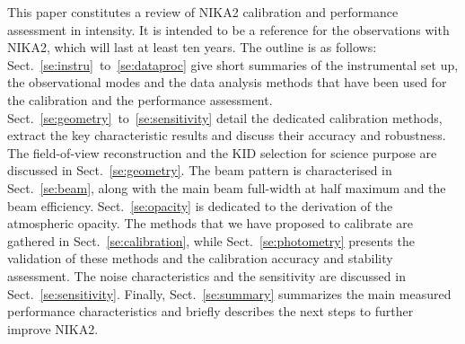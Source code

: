 This paper constitutes a review of NIKA2 calibration and
performance assessment in intensity. It is intended to be a reference
for the observations with NIKA2, which will last at least ten years. 
The outline is as follows:
Sect.~\ref{se:instru}~to~\ref{se:dataproc} give short summaries of the
instrumental set up, the observational modes and the data analysis methods
that have been used for the calibration and the performance
assessment. Sect.~\ref{se:geometry}~to~\ref{se:sensitivity} detail the
dedicated calibration methods, extract the key characteristic results
and discuss their accuracy and robustness. The field-of-view
reconstruction and the KID selection for science purpose are discussed
in Sect.~\ref{se:geometry}. The beam pattern is characterised in
Sect.~\ref{se:beam}, along with the main beam
full-width at half maximum and the beam
efficiency. Sect.~\ref{se:opacity} is dedicated to the derivation of
the atmospheric opacity. The methods that we have proposed to
calibrate are gathered in Sect.~\ref{se:calibration}, while
Sect.~\ref{se:photometry} presents the validation of these methods and
the calibration accuracy and stability assessment. The noise
characteristics and the sensitivity are discussed in
Sect.~\ref{se:sensitivity}. Finally, Sect.~\ref{se:summary} summarizes
the main measured performance characteristics and {\lp briefly
describes the next steps to further improve NIKA2.}















